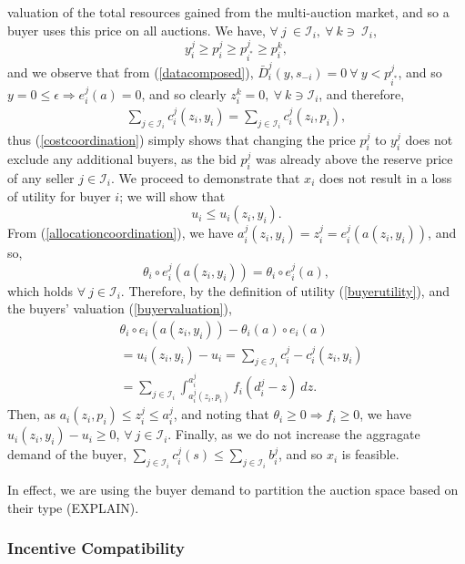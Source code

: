 \documentclass[12pt]{article}
\theoremstyle{definition}
\newcommand{\mcI}{\mathcal{I}}
\begin{document}
\begin{multicols}{2}
valuation of the total resources gained from the multi-auction market, and so a buyer uses this price on all
auctions.
We have, $\forall \ j\  \in \mcI_i, \ \forall \ k \ni \ \mcI_i$,
$$
    y_i^j \ge p_i^j \ge p_{i^*}^j\ge p_i^k,
$$
and we observe that from (\ref{datacomposed}), $\bar{D}_i^j(y, s_{-i}) =
0 \ \forall \ y < p_{i^*}^j$, and so $y=0 \le \epsilon \Rightarrow e_i^j(a) = 0$,
and so clearly $z_i^k = 0, \ \forall \ k \ni \mcI_i$, and therefore,
\begin{align*}
    \displaystyle\sum_{j\in\mcI_i} c_i^j(z_i,y_i) =\sum_{j\in\mcI_i}
c_i^j(z_i,p_i),
\end{align*}
thus (\ref{costcoordination}) simply shows that changing the price $p^j_i$ to $y^j_i$ does not exclude any
additional buyers, as the bid $p^j_i$ was already above the reserve price of any
seller $j \in \mcI_i$.
We proceed to demonstrate that $x_i$ does not result in a loss of utility for
buyer $i$; we will show that
$$
    u_i \le u_i(z_i,y_i).
$$
From (\ref{allocationcoordination}), we have $a_i^{j}(z_i,y_i) = z_i^{j} = e_i^j(a(z_i,y_i))$, 
and so,
$$
    \theta_i\circ e_i^j(a(z_i,y_i)) = \theta_i\circ e_i^j(a),
$$ 
which holds $\forall \ j\in\mcI_i$.
Therefore, by the definition of utility (\ref{buyerutility}),
and the buyers' valuation (\ref{buyervaluation}), 
\begin{align*}
    &\theta_i\circ e_i(a(z_i,y_i)) - \theta_i(a)\circ e_i(a) \\
    &= u_i(z_i,y_i) - u_i =  \displaystyle\sum_{j\in\mcI_i} c_i^j -c_i^{j}(z_i,y_i)\\
    &= \sum_{j\in\mcI_i}\int_{a_i^j(z_i,p_i)}^{a_i^j} f_i(d_i^j - z) \ dz.
\end{align*}
Then, as $a_i(z_i,p_i) \le z_i^j \le a_i^j $, and noting that
$\theta_i\ge 0\Rightarrow f_i\ge 0$, we have $u_i(z_i,y_i) - u_i \ge 0$, $\forall \ j\in\mcI_i$.
Finally, as we do
not increase the aggragate demand of the buyer, $\sum_{j\in\mcI_i} c_i^j(s) \le 
\sum_{j\in\mcI_i} b_i^j$, and so $x_i$ is feasible.

In effect, we are using the buyer demand
to partition the auction space based on their type (EXPLAIN). \\

\subsubsection{Incentive Compatibility}


\end{multicols}
\end{document}
